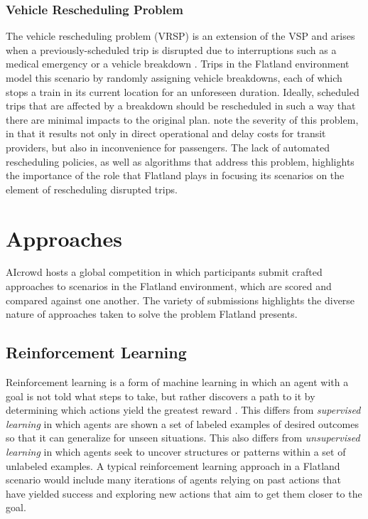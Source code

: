 \documentclass[11pt]{article}
\begin{document}
\subsubsection{Vehicle Rescheduling Problem}
The vehicle rescheduling problem (VRSP) is an extension of the VSP and arises when a previously-scheduled trip is disrupted due to interruptions such as a medical emergency or a vehicle breakdown \citep{limibo07a}.  Trips in the Flatland environment model this scenario by randomly assigning vehicle breakdowns, each of which stops a train in its current location for an unforeseen duration.  Ideally, scheduled trips that are affected by a breakdown should be rescheduled in such a way that there are minimal impacts to the original plan.  \citep{limibo07a} note the severity of this problem, in that it results not only in direct operational and delay costs for transit providers, but also in inconvenience for passengers.  The lack of automated rescheduling policies, as well as algorithms that address this problem, highlights the importance of the role that Flatland plays in focusing its scenarios on the element of rescheduling disrupted trips.


\section{Approaches}
AIcrowd hosts a global competition in which participants submit crafted approaches to scenarios in the Flatland environment, which are scored and compared against one another.  The variety of submissions highlights the diverse nature of approaches taken to solve the problem Flatland presents.

\subsection{Reinforcement Learning}
Reinforcement learning is a form of machine learning in which an agent with a goal is not told what steps to take, but rather discovers a path to it by determining which actions yield the greatest reward \citep{sutton18a}.  This differs from \textit{supervised learning} in which agents are shown a set of labeled examples of desired outcomes so that it can generalize for unseen situations.  This also differs from \textit{unsupervised learning} in which agents seek to uncover structures or patterns within a set of unlabeled examples.  A typical reinforcement learning approach in a Flatland scenario would include many iterations of agents relying on past actions that have yielded success and exploring new actions that aim to get them closer to the goal.
\end{document}
